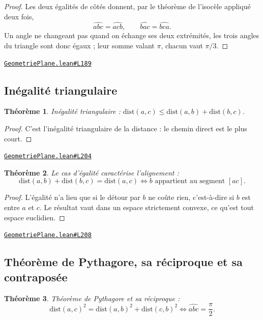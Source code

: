 \documentclass[11pt,a4paper]{article}
\theoremstyle{definition}
\theoremstyle{plain}
\newtheorem{theoreme}{Théorème}
\newcommand{\source}[2]{\par\smallskip\noindent\hfill{\footnotesize\href{#1}{\texttt{#2}}}\par\smallskip}
\begin{document}
\begin{proof}
Les deux égalités de côtés donnent, par le théorème de l'isocèle appliqué deux fois,
\[ \widehat{abc} = \widehat{acb}, \qquad \widehat{bac} = \widehat{bca} . \]
Un angle ne changeant pas quand on échange ses deux extrémités, les trois angles du
triangle sont donc égaux ; leur somme valant $\pi$, chacun vaut $\pi/3$.
\end{proof}
\source{https://github.com/Commutator-IO/learn-lean/blob/main/cours/01-college/02-geometrie-plane/GeometriePlane.lean\#L189}{GeometriePlane.lean\#L189}

\subsection{Inégalité triangulaire}

\begin{theoreme}
Inégalité triangulaire : $\mathrm{dist}(a,c) \le \mathrm{dist}(a,b) + \mathrm{dist}(b,c)$.
\end{theoreme}

\begin{proof}
C'est l'inégalité triangulaire de la distance : le chemin direct est le plus court.
\end{proof}
\source{https://github.com/Commutator-IO/learn-lean/blob/main/cours/01-college/02-geometrie-plane/GeometriePlane.lean\#L204}{GeometriePlane.lean\#L204}

\begin{theoreme}
Le cas d'égalité caractérise l'alignement :
\[ \mathrm{dist}(a,b) + \mathrm{dist}(b,c) = \mathrm{dist}(a,c)
   \iff b \text{ appartient au segment } [ac] . \]
\end{theoreme}

\begin{proof}
L'égalité n'a lieu que si le détour par $b$ ne coûte rien, c'est-à-dire si $b$ est entre
$a$ et $c$. Le résultat vaut dans un espace strictement convexe, ce qu'est tout espace
euclidien.
\end{proof}
\source{https://github.com/Commutator-IO/learn-lean/blob/main/cours/01-college/02-geometrie-plane/GeometriePlane.lean\#L208}{GeometriePlane.lean\#L208}

\subsection{Théorème de Pythagore, sa réciproque et sa contraposée}

\begin{theoreme}
Théorème de Pythagore et sa réciproque :
\[ \mathrm{dist}(a,c)^2 = \mathrm{dist}(a,b)^2 + \mathrm{dist}(c,b)^2
   \iff \widehat{abc} = \frac{\pi}{2} . \]
\end{theoreme}
\end{document}
